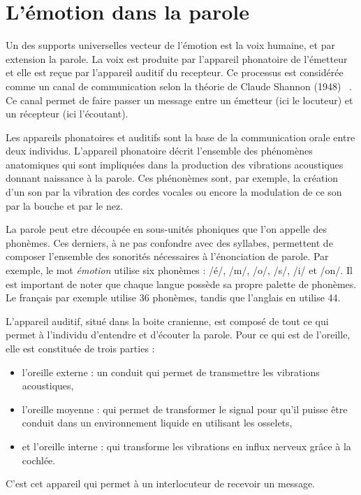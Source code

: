 \section{L'émotion dans la parole}
Un des supports universelles vecteur de l'émotion est la voix humaine, et par extension la parole.
La voix est produite par l'appareil phonatoire de l'émetteur et elle est reçue par l'appareil auditif du recepteur. Ce processus est considérée comme un canal de communication selon la théorie de Claude Shannon (1948) ~\cite{Shannon1948}. Ce canal permet de faire passer un message entre un émetteur (ici le locuteur) et un récepteur (ici l'écoutant).

Les appareils phonatoires et auditifs sont la base de la communication orale entre deux individus. L'appareil phonatoire décrit l'ensemble des phénomènes anatomiques qui sont impliquées dans la production des vibrations acoustiques donnant naissance à la parole. Ces phénonèmes sont, par exemple, la création d'un son par la vibration des cordes vocales ou encore la modulation de ce son par la bouche et par le nez.

La parole peut etre découpée en sous-unités phoniques que l'on appelle des phonèmes. Ces derniers, à ne pas confondre avec des syllabes, permettent de composer l'ensemble des sonorités nécessaires à l'énonciation de parole.
Par exemple, le mot \textit{émotion} utilise six phonèmes : /é/, /m/, /o/, /s/, /i/ et /on/.
Il est important de noter que chaque langue possède sa propre palette de phonèmes. Le français par exemple utilise 36 phonèmes, tandis que l'anglais en utilise 44.

L'appareil auditif, situé dans la boite cranienne, est composé de tout ce qui permet à l'individu d'entendre et d'écouter la parole. Pour ce qui est de l'oreille, elle est constituée de trois parties :
\begin{itemize}
  \item l'oreille externe : un conduit qui permet de transmettre les vibrations acoustiques,
  \item l'oreille moyenne : qui permet de transformer le signal pour qu'il puisse être conduit dans un environnement liquide en utilisant les osselets,
  \item et l'oreille interne : qui transforme les vibrations en influx nerveux grâce à la cochlée.
\end{itemize}
C'est cet appareil qui permet à un interlocuteur de recevoir un message.

